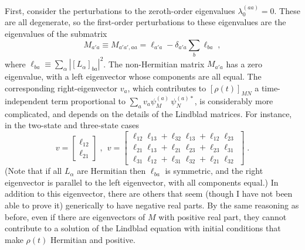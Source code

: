 First, consider the perturbations to the zeroth-order eigenvalues $\lambda_0^{(aa)}=0$.  These are all degenerate, so the first-order perturbations to these eigenvalues are the eigenvalues of the submatrix
\begin{equation}
M_{a'a}\equiv M_{a'a',aa}=\ell_{a'a}-\delta_{a'a}\sum_b\ell_{ba}\;,
\end{equation}
where $\ell_{ba}\equiv \sum_\alpha|[L_\alpha]_{ba}|^2$.  The non-Hermitian matrix $M_{a'a}$ has a zero eigenvalue, with a left eigenvector whose components are all equal.  The corresponding right-eigenvector $v_a$, which contributes to $[\rho(t)]_{MN}$  a time-independent term proportional to $\sum_a v_a \psi^{(a)}_M\,\psi^{(a)*}_N$, is considerably more complicated, and depends on the details of the Lindblad matrices.  For instance, in the two-state and three-state cases
$$ v=\left[\begin{array}{c}\ell_{12}\\ \ell_{21}\end{array}\right]\;,~~
v=\left[\begin{array}{c}\ell_{12}\ell_{13}+\ell_{32}\ell_{13}+\ell_{12}\ell_{23}\\
\ell_{21}\ell_{13}+\ell_{21}\ell_{23}+\ell_{23}\ell_{31}\\  \ell_{31}\ell_{12}+\ell_{31}\ell_{32}+\ell_{21}\ell_{32}\end{array}\right]\;.$$
(Note that if all $L_\alpha$ are Hermitian then $\ell_{ba}$ is symmetric, and the right eigenvector is parallel to the left eigenvector, with all components equal.)  
In addition to this eigenvector, there are others that seem (though I have not been able to prove it) generically to have negative real parts.  By the same reasoning as before, even if there are eigenvectors of $M$ with positive real part, they cannot contribute to a solution of the Lindblad equation with initial conditions that make $\rho(t)$ Hermitian and positive.



